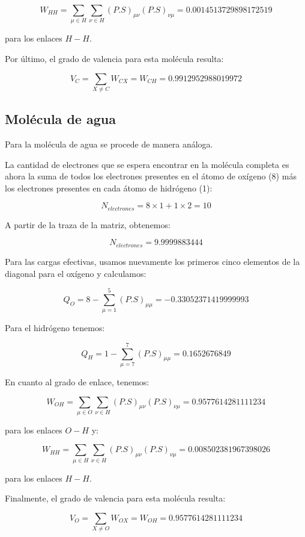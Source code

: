 \documentclass[10pt,a4paper]{article}
\begin{document}
\begin{equation}
W_{HH} = \sum_{\mu \in H} \sum_{\nu \in H} (P.S)_{\mu \nu} (P.S)_{\nu \mu} = 0.0014513729898172519
\end{equation}

para los enlaces $H-H$.

Por último, el grado de valencia para esta molécula resulta:

\begin{equation}
V_{C} = \sum_{X \neq C} W_{CX} = W_{CH} = 0.9912952988019972
\end{equation}


\subsection*{Molécula de agua}

Para la molécula de agua se procede de manera análoga.

La cantidad de electrones que se espera encontrar en la molécula completa es ahora la suma de todos los electrones presentes en el átomo de oxígeno (8) más los electrones presentes en cada átomo de hidrógeno (1):

\begin{equation}
N_{electrones} = 8 \times 1 + 1 \times 2 = 10
\end{equation}

A partir de la traza de la matriz, obtenemos:

\begin{equation}
N_{electrones} = 9.9999883444
\end{equation}

Para las cargas efectivas, usamos nuevamente los primeros cinco elementos de la diagonal para el oxígeno y calculamos:

\begin{equation}
Q_{O} = 8 - \sum_{\mu=1}^{5} (P.S)_{\mu \mu} = -0.33052371419999993
\end{equation}

Para el hidrógeno tenemos:

\begin{equation}
Q_{H} = 1 - \sum_{\mu=7}^{7} (P.S)_{\mu \mu} = 0.1652676849
\end{equation}

En cuanto al grado de enlace, tenemos:

\begin{equation}
W_{OH} = \sum_{\mu \in O} \sum_{\nu \in H} (P.S)_{\mu \nu} (P.S)_{\nu \mu} = 0.9577614281111234
\end{equation}

para los enlaces $O-H$ y:

\begin{equation}
W_{HH} = \sum_{\mu \in H} \sum_{\nu \in H} (P.S)_{\mu \nu} (P.S)_{\nu \mu} = 0.008502381967398026
\end{equation}

para los enlaces $H-H$.

Finalmente, el grado de valencia para esta molécula resulta:

\begin{equation}
V_{O} = \sum_{X \neq O} W_{OX} = W_{OH} = 0.9577614281111234
\end{equation}
\end{document}
